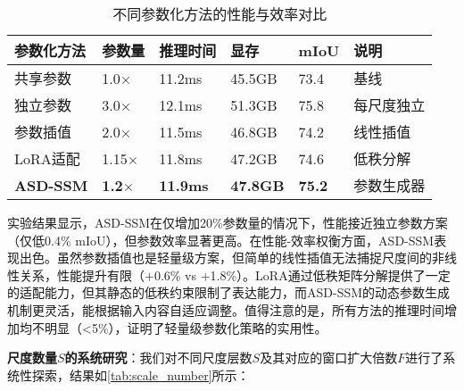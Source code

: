 \documentclass[preprint,12pt]{elsarticle}
\begin{document}
\begin{table}[htbp!]
	\centering
	\caption{不同参数化方法的性能与效率对比}
	\label{tab:parameterization_comparison}
	\begin{tabular}{@{}llllll@{}}
		\toprule
		参数化方法 & 参数量 & 推理时间 & 显存 & mIoU & 说明 \\ 
		\midrule
		共享参数 & 1.0$\times$ & 11.2ms & 45.5GB & 73.4 & 基线 \\
		\midrule
		独立参数 & 3.0$\times$ & 12.1ms & 51.3GB & 75.8 & 每尺度独立 \\
		参数插值 & 2.0$\times$ & 11.5ms & 46.8GB & 74.2 & 线性插值 \\
		LoRA适配 & 1.15$\times$ & 11.8ms & 47.2GB & 74.6 & 低秩分解 \\
		\textbf{ASD-SSM} & \textbf{1.2$\times$} & \textbf{11.9ms} & \textbf{47.8GB} & \textbf{75.2} & 参数生成器 \\
		\bottomrule
	\end{tabular}
\end{table}

实验结果显示，ASD-SSM在仅增加20\%参数量的情况下，性能接近独立参数方案（仅低0.4\% mIoU），但参数效率显著更高。在性能-效率权衡方面，ASD-SSM表现出色。虽然参数插值也是轻量级方案，但简单的线性插值无法捕捉尺度间的非线性关系，性能提升有限（+0.6\% vs +1.8\%）。LoRA通过低秩矩阵分解提供了一定的适配能力，但其静态的低秩约束限制了表达能力，而ASD-SSM的动态参数生成机制更灵活，能根据输入内容自适应调整。值得注意的是，所有方法的推理时间增加均不明显（<5\%），证明了轻量级参数化策略的实用性。

\textbf{尺度数量$S$的系统研究}：我们对不同尺度层数$S$及其对应的窗口扩大倍数$F$进行了系统性探索，结果如\cref{tab:scale_number}所示：
\end{document}
